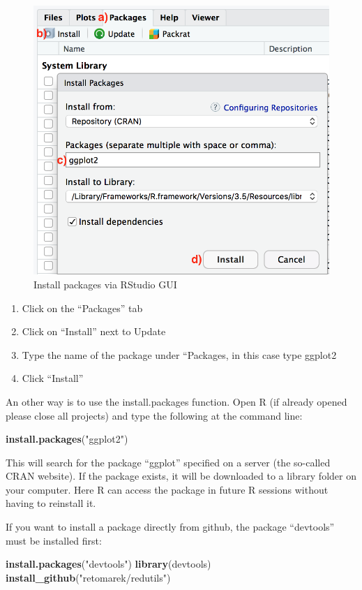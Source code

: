 \documentclass[
]{book}
\newenvironment{Shaded}{\begin{snugshade}}{\end{snugshade}}
\newcommand{\KeywordTok}[1]{\textcolor[rgb]{0.13,0.29,0.53}{\textbf{#1}}}
\newcommand{\NormalTok}[1]{#1}
\newcommand{\StringTok}[1]{\textcolor[rgb]{0.31,0.60,0.02}{#1}}
\begin{document}
\begin{figure}
\includegraphics[width=0.5\linewidth]{images/a2-installPackagesRStudio} \caption{Install packages via RStudio GUI}\label{fig:knitr-logo}
\end{figure}

\begin{enumerate}
\def\labelenumi{\alph{enumi})}
\item
  Click on the ``Packages'' tab
\item
  Click on ``Install'' next to Update
\item
  Type the name of the package under ``Packages, in this case type ggplot2
\item
  Click ``Install''
\end{enumerate}

An other way is to use the install.packages function.
Open R (if already opened please close all projects) and type the following at the command line:

\begin{Shaded}
\begin{Highlighting}[]
\KeywordTok{install.packages}\NormalTok{(}\StringTok{"ggplot2"}\NormalTok{)}
\end{Highlighting}
\end{Shaded}

This will search for the package ``ggplot'' specified on a server (the so-called CRAN website). If the package exists, it will be downloaded to a library folder on your computer. Here R can access the package in future R sessions without having to reinstall it.

If you want to install a package directly from github, the package ``devtools'' must be installed first:

\begin{Shaded}
\begin{Highlighting}[]
\KeywordTok{install.packages}\NormalTok{(}\StringTok{"devtools"}\NormalTok{)}
\KeywordTok{library}\NormalTok{(devtools)}
\KeywordTok{install_github}\NormalTok{(}\StringTok{"retomarek/redutils"}\NormalTok{)}
\end{Highlighting}
\end{Shaded}
\end{document}
